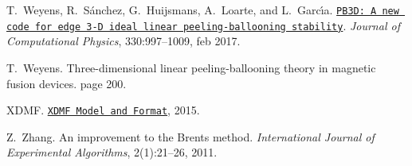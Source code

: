 \begin{DoxyDescription}
\item[\label{_CITEREF_Weyens2017PB3D}%
\mbox{[}16\mbox{]}]T.~Weyens, R.~S\'{a}nchez, G.~Huijsmans, A.~Loarte, and L.~Garc\'{\i}a. \href{http://linkinghub.elsevier.com/retrieve/pii/S0021999116305629}{\tt P\+B3\+D\+: A new code for edge 3-\/D ideal linear peeling-\/ballooning stability}. {\itshape Journal of Computational Physics}, 330\+:997--1009, feb 2017. 


\item[\label{_CITEREF_Weyens3D}%
\mbox{[}17\mbox{]}]T.~Weyens. Three-\/dimensional linear peeling-\/ballooning theory in magnetic fusion devices. page 200.


\item[\label{_CITEREF_xdmf}%
\mbox{[}18\mbox{]}]X\+D\+MF. \href{http://www.xdmf.org/index.php/XDMF_Model_and_Format}{\tt X\+D\+MF Model and Format}, 2015.


\item[\label{_CITEREF_zhang2011improvement}%
\mbox{[}19\mbox{]}]Z.~Zhang. An improvement to the Brent\textquotesingle{}s method. {\itshape International Journal of Experimental Algorithms}, 2(1)\+:21--26, 2011.


\end{DoxyDescription}